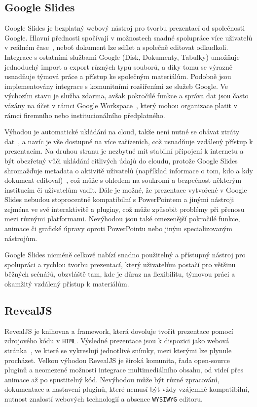 \subsection{Google Slides}\label{text:google_slides}

Google Slides je bezplatný webový nástroj pro tvorbu prezentací od společnosti Google. 
Hlavní přednosti spočívají v možnostech snadné spolupráce více uživatelů v reálném čase~\cite{slides}, neboť dokument lze sdílet a společně editovat odkudkoli.
Integrace s ostatními službami Google (Disk, Dokumenty, Tabulky) umožňuje jednoduchý import a export různých typů souborů, a díky tomu se výrazně usnadňuje týmová práce a přístup ke společným materiálům. 
Podobně jsou implementovány integrace s komunitními rozšířeními ze služeb Google.
Ve výchozím stavu je služba zdarma, avšak pokročilé funkce a správa dat jsou často vázány na účet v rámci Google Workspace~\cite{slides}, který mohou organizace platit v rámci firemního nebo institucionálního předplatného. 

Výhodou je automatické ukládání na cloud, takže není nutné se obávat ztráty dat~\cite{slides}, a navíc je vše dostupné na více zařízeních, což usnadňuje vzdálený přístup k prezentacím. 
Na druhou stranu je nezbytné mít stabilní připojení k internetu a být obezřetný vůči ukládání citlivých údajů do cloudu, protože Google Slides shromažďuje metadata o aktivitě uživatelů (například informace o tom, kdo a kdy dokument editoval)~\cite{google_terms}, což může s ohledem na soukromí a bezpečnost některým institucím či uživatelům vadit. 
Dále je možné, že prezentace vytvořené v Google Slides nebudou stoprocentně kompatibilní s PowerPointem a jinými nástroji zejména ve své interaktivitě a pluginy, což může způsobit problémy při přenosu mezi různými platformami. 
Nevýhodou jsou také omezenější pokročilé funkce, animace či grafické úpravy oproti PowerPointu nebo jiným specializovaným nástrojům. 

Google Slides nicméně celkově nabízí snadno použitelný a přístupný nástroj pro spolupráci a rychlou tvorbu prezentací, který uživatelům postačí pro většinu běžných scénářů, obzvláště tam, kde je důraz na flexibilitu, týmovou práci a okamžitý vzdálený přístup k materiálům.


\subsection{RevealJS}\label{text:revealjs}

RevealJS je knihovna a framework, která dovoluje tvořit prezentace pomocí zdrojového kódu v \texttt{HTML}. 
Výsledné prezentace jsou k dispozici jako webová stránka~\cite{revealjs}, ve které se vykreslují jednotlivé snímky, mezi kterými lze plynule procházet. 
Velkou výhodou RevealJS je široká komunita, řada open-source pluginů a neomezené možnosti integrace multimediálního obsahu, od videí přes animace až po spustitelný kód. 
Nevýhodou může být různé zpracování, dokumentace a nastavení pluginů, které nemusí být vždy vzájemně kompatibilní, nutnost znalostí webových technologií a absence \texttt{WYSIWYG} editoru. 

